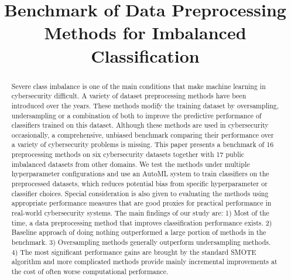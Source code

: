 \documentclass[conference]{IEEEtran}
\begin{document}
\title{Benchmark of Data Preprocessing Methods for Imbalanced Classification}

\author{
}

\IEEEoverridecommandlockouts
{}

\maketitle
\IEEEpubidadjcol

\begin{abstract}
    Severe class imbalance is one of the main conditions that make machine learning in
    cybersecurity difficult. A variety of dataset preprocessing methods have been introduced over
    the years. These methods modify the training dataset by oversampling, undersampling or a
    combination of both to improve the predictive performance of classifiers trained on this
    dataset. Although these methods are used in cybersecurity occasionally, a comprehensive,
    unbiased benchmark comparing their performance over a variety of cybersecurity problems is
    missing. This paper presents a benchmark of 16 preprocessing methods on six cybersecurity
    datasets together with 17 public imbalanced datasets from other domains. We test the methods
    under multiple hyperparameter configurations and use an AutoML system to train classifiers on
    the preprocessed datasets, which reduces potential bias from specific hyperparameter or
    classifier choices. Special consideration is also given to evaluating the methods using
    appropriate performance measures that are good proxies for practical performance in real-world
    cybersecurity systems. The main findings of our study are: 1) Most of the time, a data
    preprocessing method that improves classification performance exists. 2) Baseline approach of
    doing nothing outperformed a large portion of methods in the benchmark. 3) Oversampling methods
    generally outperform undersampling methods. 4) The most significant performance gains are
    brought by the standard SMOTE algorithm and more complicated methods provide mainly incremental
    improvements at the cost of often worse computational performance.
\end{abstract}
\end{document}
